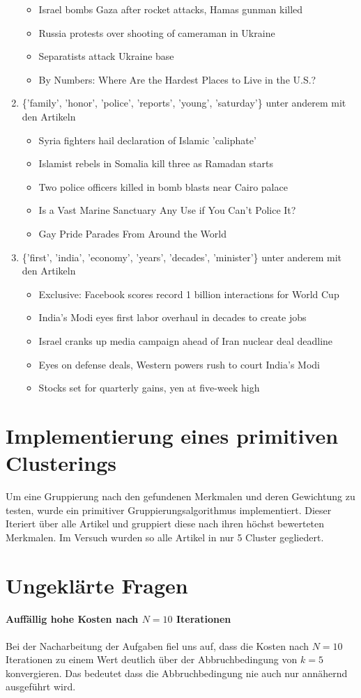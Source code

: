 \documentclass[12pt,a4paper]{scrartcl}
\begin{document}
\begin{enumerate}
{\begin{itemize}
	\item{Israel bombs Gaza after rocket attacks, Hamas gunman killed}
	\item{Russia protests over shooting of cameraman in Ukraine}
	\item{Separatists attack Ukraine base}
	\item{By Numbers: Where Are the Hardest Places to Live in the U.S.?}
	\end{itemize}}
\item{\{'family', 'honor', 'police', 'reports', 'young', 'saturday'\} unter anderem mit den Artikeln
	\begin{itemize}
	\item{Syria fighters hail declaration of Islamic 'caliphate'}
	\item{Islamist rebels in Somalia kill three as Ramadan starts}
	\item{Two police officers killed in bomb blasts near Cairo palace}
	\item{Is a Vast Marine Sanctuary Any Use if You Can’t Police It?}
	\item{Gay Pride Parades From Around the World}
	\end{itemize}}
\item{\{'first', 'india', 'economy', 'years', 'decades', 'minister'\} unter anderem mit den Artikeln
	\begin{itemize}
	\item{Exclusive: Facebook scores record 1 billion interactions for World Cup}
	\item{India's Modi eyes first labor overhaul in decades to create jobs}
	\item{Israel cranks up media campaign ahead of Iran nuclear deal deadline}
	\item{Eyes on defense deals, Western powers rush to court India's Modi}
	\item{Stocks set for quarterly gains, yen at five-week high}
	\end{itemize}}
\end{enumerate}

\section*{Implementierung eines primitiven Clusterings}
Um eine Gruppierung nach den gefundenen Merkmalen und deren Gewichtung zu testen, wurde ein primitiver Gruppierungsalgorithmus implementiert. Dieser Iteriert über alle Artikel und gruppiert diese nach ihren höchst bewerteten Merkmalen. Im Versuch wurden so alle Artikel in nur 5 Cluster gegliedert.

\section*{Ungeklärte Fragen}
\paragraph{Auffällig hohe Kosten nach $N=10$ Iterationen}
Bei der Nacharbeitung der Aufgaben fiel uns auf, dass die Kosten nach $N=10$ Iterationen zu einem Wert deutlich über der Abbruchbedingung von $k=5$ konvergieren. Das bedeutet dass die Abbruchbedingung nie auch nur annähernd ausgeführt wird.
\end{document}
